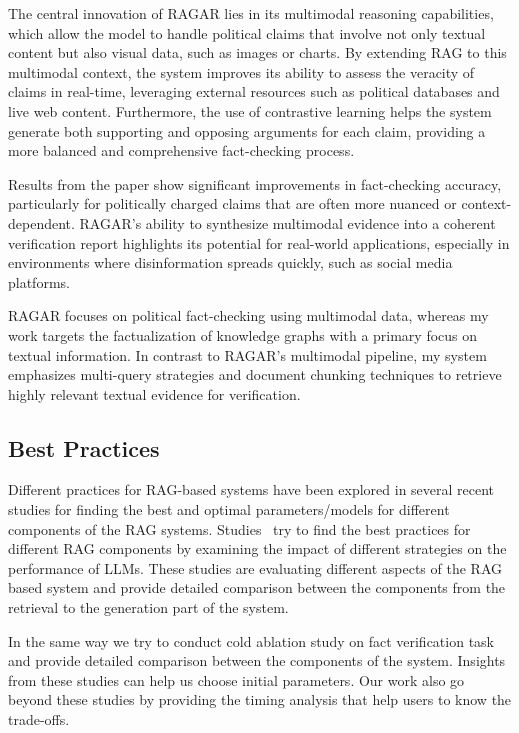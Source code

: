 The central innovation of RAGAR lies in its multimodal reasoning capabilities, which allow the model to handle political claims that involve not only textual content but also visual data, such as images or charts.
By extending RAG to this multimodal context, the system improves its ability to assess the veracity of claims in real-time, leveraging external resources such as political databases and live web content.
Furthermore, the use of contrastive learning helps the system generate both supporting and opposing arguments for each claim, providing a more balanced and comprehensive fact-checking process.

Results from the paper show significant improvements in fact-checking accuracy, particularly for politically charged claims that are often more nuanced or context-dependent.
RAGAR's ability to synthesize multimodal evidence into a coherent verification report highlights its potential for real-world applications, especially in environments where disinformation spreads quickly, such as social media platforms.

RAGAR focuses on political fact-checking using multimodal data, whereas my work targets the factualization of knowledge graphs with a primary focus on textual information.
In contrast to RAGAR’s multimodal pipeline, my system emphasizes multi-query strategies and document chunking techniques to retrieve highly relevant textual evidence for verification.

\subsection{Best Practices}\label{subsec:rag-base-systems-best-practices}
Different practices for \ac{RAG}-based systems have been explored in several recent studies for finding the best and optimal parameters/models for different components of the \ac{RAG} systems.
Studies~\cite{wang2024searchingbestpracticesretrievalaugmented, llamaindex_chunk_size} try to find the best practices for different \ac{RAG} components by examining the impact of different strategies on the performance of \ac{LLMs}.
These studies are evaluating different aspects of the RAG based system and provide detailed comparison between the components from the retrieval to the generation part of the system.

In the same way we try to conduct cold ablation study on fact verification task and provide detailed comparison between the components of the system.
Insights from these studies can help us choose initial parameters.
Our work also go beyond these studies by providing the timing analysis that help users to know the trade-offs.

